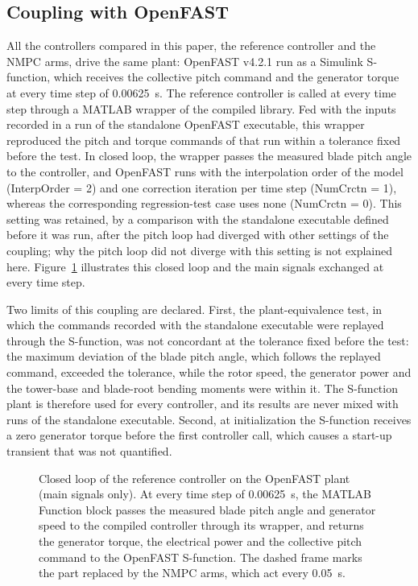 \subsection{Coupling with OpenFAST}
\label{subsec:coupling}
{\color{revQ1}
All the controllers compared in this paper, the reference controller and the NMPC arms, drive the same plant: OpenFAST v4.2.1 run as a Simulink S-function, which receives the collective pitch command and the generator torque at every time step of 0.00625~s. The reference controller is called at every time step through a MATLAB wrapper of the compiled library. Fed with the inputs recorded in a run of the standalone OpenFAST executable, this wrapper reproduced the pitch and torque commands of that run within a tolerance fixed before the test. In closed loop, the wrapper passes the measured blade pitch angle to the controller, and OpenFAST runs with the interpolation order of the model (InterpOrder = 2) and one correction iteration per time step (NumCrctn = 1), whereas the corresponding regression-test case uses none (NumCrctn = 0). This setting was retained, by a comparison with the standalone executable defined before it was run, after the pitch loop had diverged with other settings of the coupling; why the pitch loop did not diverge with this setting is not explained here. Figure~\ref{fig:E3_loop} illustrates this closed loop and the main signals exchanged at every time step.

Two limits of this coupling are declared. First, the plant-equivalence test, in which the commands recorded with the standalone executable were replayed through the S-function, was not concordant at the tolerance fixed before the test: the maximum deviation of the blade pitch angle, which follows the replayed command, exceeded the tolerance, while the rotor speed, the generator power and the tower-base and blade-root bending moments were within it. The S-function plant is therefore used for every controller, and its results are never mixed with runs of the standalone executable. Second, at initialization the S-function receives a zero generator torque before the first controller call, which causes a start-up transient that was not quantified.
}

\begin{figure}[htbp]
\centering

\caption{{\color{revQ1}Closed loop of the reference controller on the OpenFAST plant (main signals only). At every time step of 0.00625~s, the MATLAB Function block passes the measured blade pitch angle and generator speed to the compiled controller through its wrapper, and returns the generator torque, the electrical power and the collective pitch command to the OpenFAST S-function. The dashed frame marks the part replaced by the NMPC arms, which act every 0.05~s.}}
\label{fig:E3_loop}
\end{figure}

